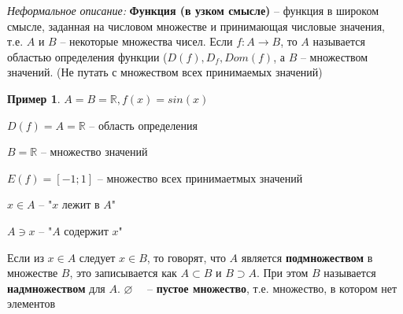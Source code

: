 \documentclass[12pt,oneside]{article}
\theoremstyle{definition}
\newtheorem{exmp}{Пример}[section]
\begin{document}
{\it Неформальное описание: } \textbf{Функция (в узком смысле)} \--- функция в широком смысле, заданная на числовом множестве и принимающая числовые значения, т.е. $A$ и $B$ \--- некоторые множества чисел.
Если $f: A\longrightarrow B$, то $A$ называется областью определения функции ($D(f), D_{f}, Dom(f)$, а $B$ \--- множеством значений. (Не путать с множеством всех принимаемых значений)\newline
\begin{exmp}
$A=B=\mathbb{R}, f(x)=sin(x)$

$D(f) = A = \mathbb{R}$ \--- область определения

$B = \mathbb{R}$ \--- множество значений

$E(f)=[-1;1]$ \--- множество всех принимаетмых значений
\end{exmp}

$x\in A$ \--- "$x$ лежит в $A$"

$A\ni x$ \--- "$A$ содержит $x$"

Если из $x\in A$ следует $x\in B$, то говорят, что $A$ является \textbf{подмножеством} в множестве $B$, это записывается как
$A\subset B$ и 
$B\supset A$. При этом $B$ называется \textbf{надмножеством} для $A$.\newline \newline
$\varnothing $ \ \ \--- \textbf{пустое множество}, т.е. множество, в котором нет элементов
\end{document}
